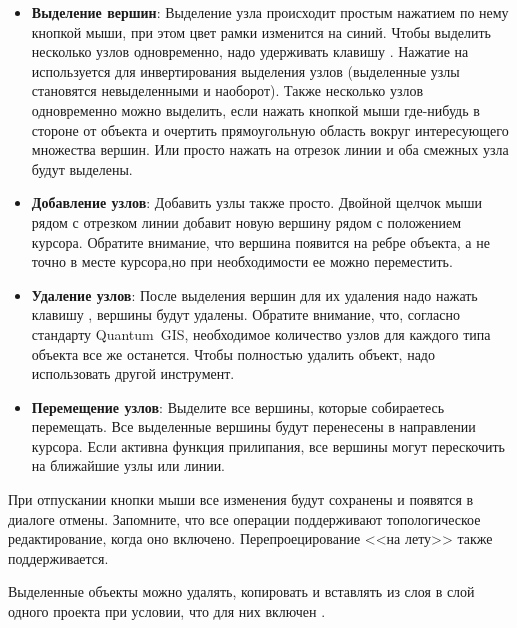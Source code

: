 \begin{itemize}[label=--]
\item \textbf{Выделение вершин}: Выделение узла происходит простым нажатием
по нему кнопкой мыши, при этом цвет рамки изменится на синий. Чтобы выделить
несколько узлов одновременно, надо удерживать клавишу
. Нажатие на
 используется для инвертирования выделения узлов (выделенные
узлы становятся невыделенными и наоборот). Также несколько узлов одновременно
можно выделить, если нажать кнопкой мыши где-нибудь в стороне от объекта и
очертить прямоугольную область вокруг интересующего множества вершин. Или
просто нажать на отрезок линии и оба смежных узла будут выделены.
\item \textbf{Добавление узлов}: Добавить узлы также просто. Двойной щелчок
мыши рядом с отрезком линии добавит новую вершину рядом с положением курсора.
Обратите внимание, что вершина появится на ребре объекта, а не точно в
месте курсора,но при необходимости ее можно переместить.
\item \textbf{Удаление узлов}: После выделения вершин для их удаления надо
нажать клавишу , вершины будут удалены. Обратите внимание,
что, согласно стандарту Quantum~GIS, необходимое количество узлов для каждого
типа объекта все же останется. Чтобы полностью удалить объект, надо использовать
другой инструмент.
\item \textbf{Перемещение узлов}: Выделите все вершины, которые собираетесь
перемещать. Все выделенные вершины будут перенесены в направлении курсора.
Если активна функция прилипания, все вершины могут перескочить на
ближайшие узлы или линии.
\end{itemize}

При отпускании кнопки мыши все изменения будут сохранены и появятся в
диалоге отмены. Запомните, что все операции поддерживают топологическое
редактирование, когда оно включено. Перепроецирование <<на лету>> также
поддерживается.


Выделенные объекты можно удалять, копировать и вставлять из слоя в слой
одного проекта \qg  при условии, что для них включен
.

